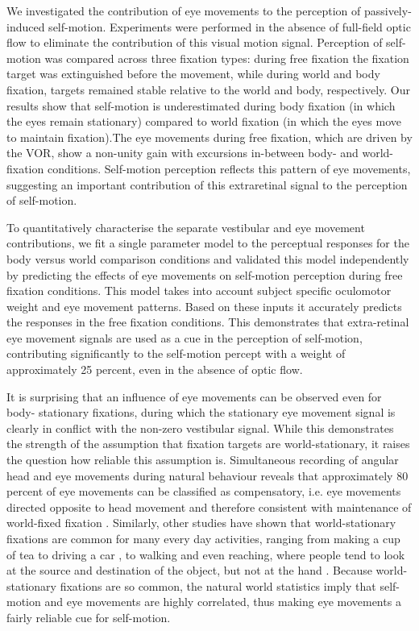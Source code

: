 We investigated the contribution of eye movements to the perception of passively-induced self-motion. Experiments were performed in the absence of full-field optic flow to eliminate the contribution of this visual motion signal. Perception of self-motion was compared across three fixation types: during free fixation the fixation target was extinguished before the movement, while during world and body fixation, targets  remained stable relative to the world and body, respectively. Our results show that self-motion is underestimated during body fixation (in which the eyes remain stationary) compared to world fixation (in which the eyes move to maintain fixation).The eye movements during free fixation, which  are driven by the VOR, show a non-unity gain with excursions in-between body- and world-fixation conditions. Self-motion perception reflects this pattern of eye movements, suggesting an important contribution of this extraretinal signal to the perception of self-motion.

 To quantitatively characterise the separate vestibular and eye movement contributions, we fit a single parameter model to the perceptual responses for the body versus world comparison conditions and validated this model independently by predicting the effects of eye movements on self-motion perception during free fixation conditions. This model takes into account subject specific oculomotor weight and eye movement patterns. Based on these inputs it accurately predicts the responses in the free fixation conditions. This demonstrates that extra-retinal eye movement signals are used as a cue in the perception of self-motion, contributing significantly to the self-motion percept with a weight of approximately 25 percent, even in the absence of optic flow.

It is surprising that an influence of eye movements can be observed even for body- stationary fixations, during which the stationary eye movement signal is clearly in conflict with the non-zero vestibular signal. While this demonstrates the strength of the assumption that fixation targets are world-stationary, it raises the question how reliable this assumption is. Simultaneous recording of angular head and eye movements during natural behaviour reveals that approximately 80 percent of eye movements can be classified as compensatory, i.e. eye movements directed opposite to head movement and therefore consistent with maintenance of world-fixed fixation \cite{einhauser2007}. Similarly, other studies have shown that world-stationary fixations are common for many every day activities, ranging from making a cup of tea \cite{hayhoe2014} to driving a car \cite{land1994}, to walking \cite{foulsham2011} and even reaching, where people tend to look at the source and destination of the object, but not at the hand \cite{flanagan2003}. Because world-stationary fixations are so common, the natural world statistics imply that self-motion and eye movements are highly correlated, thus making eye movements a fairly reliable cue for self-motion.

